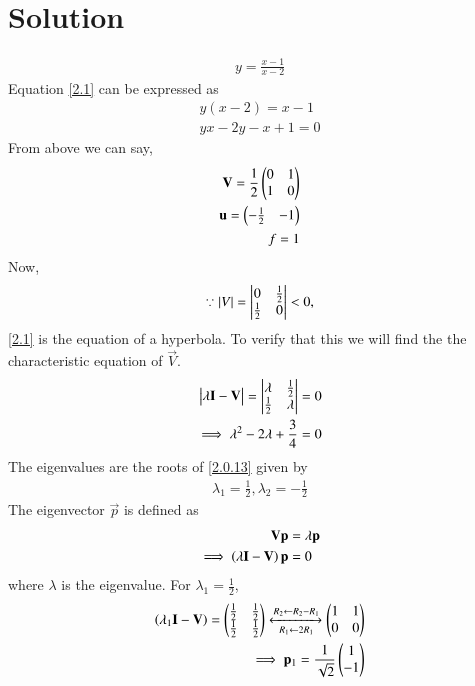 \documentclass[journal,12pt,twocolumn]{IEEEtran}
\begin{document}
  \section{\textbf{Solution}}
\begin{align}
y=\frac{x-1}{x-2}\label{2.1}
\end{align}
Equation \eqref{2.1} can be expressed as
\begin{align}
y(x-2)=x-1\\
yx-2y-x+1=0\label{2.0.3}
\end{align}
From above we can say,
\begin{align}
\mathbf{V}=\frac{1}{2}\begin{pmatrix}0 & 1\\ 1 & 0\end{pmatrix}\\
\mathbf{u}=\begin{pmatrix}-\frac{1}{2}&-1\end{pmatrix}\\
f=1
\end{align}
Now,
\begin{align}
\because \left\vert V\right\vert = \begin{vmatrix}0& \frac{1}{2} \\ \frac{1}{2} & 0\end{vmatrix} < 0,
\end{align}
\eqref{2.1} is the equation of a hyperbola. To verify that this we will find the the characteristic equation of $\vec{V}$.
\begin{align}
\begin{vmatrix}\lambda \mathbf{I}-\mathbf{V}\end{vmatrix} = \begin{vmatrix}\lambda  & \frac{1}{2}\\ \frac{1}{2} & \lambda \end{vmatrix} &= 0
\\
\implies \lambda^2 - 2\lambda + \frac{3}{4} &= 0
\label{2.0.13}
\end{align}
The eigenvalues are the roots of \eqref{2.0.13} given by
\begin{align}
\lambda_1 = \frac{1}{2}, \lambda_2 = -\frac{1}{2}
\label{2.0.14}
\end{align}
The eigenvector $\vec{p}$ is defined as
\begin{align}
\mathbf{V} \mathbf{p}&= \lambda \mathbf{p}
\\
\implies \left(\lambda\mathbf{I}-\mathbf{V}\right)\mathbf{p} &=0
\end{align}
where $\lambda$ is the eigenvalue.  For $\lambda_1 = \frac{1}{2}$,
\begin{align}
\left(\lambda_1\mathbf{I}-\mathbf{V}\right)
= \begin{pmatrix}\frac{1}{2} & \frac{1}{2}
\\ \frac{1}{2} & \frac{1}{2}\end{pmatrix} 
\xleftrightarrow[R_1 \leftarrow 2R_1] {R_2\leftarrow R_2-R_1}\begin{pmatrix}1 & 1 \\0 & 0 \end{pmatrix}  
\\
\implies \mathbf{p}_1 = \frac{1}{\sqrt{2}}\begin{pmatrix}1 \\- 1\end{pmatrix}
\end{align}
\end{document}
